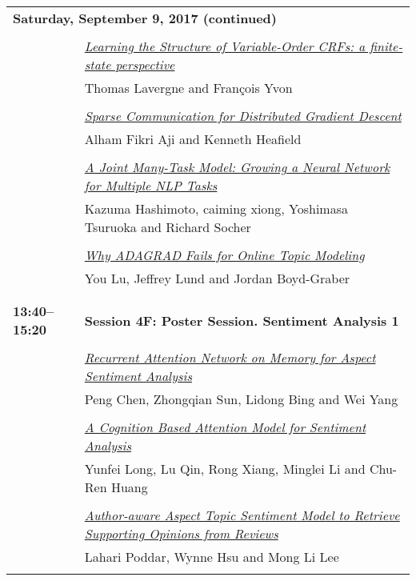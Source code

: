 \begin{tabular}{p{20mm}p{128mm}}
\\
\multicolumn{2}{l}{\bf Saturday, September 9, 2017 (continued)} \\\\
 & \hyperlink{page.431}{\em Learning the Structure of Variable-Order CRFs: a finite-state perspective}\\
         & Thomas Lavergne and Fran\c{c}ois Yvon \\
\\

 & \hyperlink{page.438}{\em Sparse Communication for Distributed Gradient Descent}\\
         & Alham Fikri Aji and Kenneth Heafield \\
\\

 & \hyperlink{page.444}{\em A Joint Many-Task Model: Growing a Neural Network for Multiple NLP Tasks}\\
         & Kazuma Hashimoto, caiming xiong, Yoshimasa Tsuruoka and Richard Socher \\
\\

 & \hyperlink{page.455}{\em Why ADAGRAD Fails for Online Topic Modeling}\\
         & You Lu, Jeffrey Lund and Jordan Boyd-Graber \\
\\

\\{\bf 13:40--15:20} & {\bf Session 4F: Poster Session. Sentiment Analysis 1 } \\
\\
 & \hyperlink{page.461}{\em Recurrent Attention Network on Memory for Aspect Sentiment Analysis}\\
         & Peng Chen, Zhongqian Sun, Lidong Bing and Wei Yang \\
\\

 & \hyperlink{page.471}{\em A Cognition Based Attention Model for Sentiment Analysis}\\
         & Yunfei Long, Lu Qin, Rong Xiang, Minglei Li and Chu-Ren Huang \\
\\

 & \hyperlink{page.481}{\em Author-aware Aspect Topic Sentiment Model to Retrieve Supporting Opinions from Reviews}\\
         & Lahari Poddar, Wynne Hsu and Mong Li Lee \\
\\


\end{tabular}
